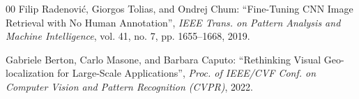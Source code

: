 \documentclass[conference]{IEEEtran}
\begin{document}
\begin{thebibliography}{00}
  Filip Radenović, Giorgos Tolias, and Ondrej Chum:
  ``Fine-Tuning CNN Image Retrieval with No Human Annotation'',
  \textit{IEEE Trans. on Pattern Analysis and Machine Intelligence}, vol. 41, no. 7, pp. 1655--1668, 2019.

  Gabriele Berton, Carlo Masone, and Barbara Caputo:
  ``Rethinking Visual Geo-localization for Large-Scale Applications'',
  \textit{Proc. of IEEE/CVF Conf. on Computer Vision and Pattern Recognition (CVPR)}, 2022.


\end{thebibliography}
\vspace{12pt}
\end{document}

